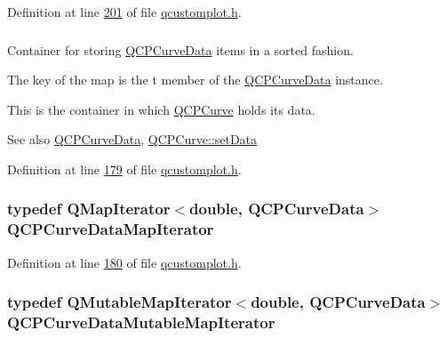 Definition at line \hyperlink{a00116_source_l00201}{201} of file \hyperlink{a00116_source}{qcustomplot.\+h}.

\hypertarget{a00116_a444d37ec9cb2951b3a7fe443c34d1658}{
\subsubsection[{Q\+C\+P\+Curve\+Data\+Map}]{}}\label{a00116_a444d37ec9cb2951b3a7fe443c34d1658}


Container for storing \hyperlink{a00029}{Q\+C\+P\+Curve\+Data} items in a sorted fashion. 

The key of the map is the t member of the \hyperlink{a00029}{Q\+C\+P\+Curve\+Data} instance.

This is the container in which \hyperlink{a00028}{Q\+C\+P\+Curve} holds its data. \begin{DoxySeeAlso}{See also}
\hyperlink{a00029}{Q\+C\+P\+Curve\+Data}, \hyperlink{a00028_a631ac886708460013b30052f49cbc9da}{Q\+C\+P\+Curve\+::set\+Data} 
\end{DoxySeeAlso}


Definition at line \hyperlink{a00116_source_l00179}{179} of file \hyperlink{a00116_source}{qcustomplot.\+h}.

\hypertarget{a00116_aeb3dbc9f09e8ce9957be86dd6e8c803d}{
\subsubsection[{Q\+C\+P\+Curve\+Data\+Map\+Iterator}]{\setlength{\rightskip}{0pt plus 5cm}typedef Q\+Map\+Iterator$<$double, {\bf Q\+C\+P\+Curve\+Data}$>$ {\bf Q\+C\+P\+Curve\+Data\+Map\+Iterator}}}\label{a00116_aeb3dbc9f09e8ce9957be86dd6e8c803d}


Definition at line \hyperlink{a00116_source_l00180}{180} of file \hyperlink{a00116_source}{qcustomplot.\+h}.

\hypertarget{a00116_ad85cf567575500cc8877fd65f4c5b9fb}{
\subsubsection[{Q\+C\+P\+Curve\+Data\+Mutable\+Map\+Iterator}]{\setlength{\rightskip}{0pt plus 5cm}typedef Q\+Mutable\+Map\+Iterator$<$double, {\bf Q\+C\+P\+Curve\+Data}$>$ {\bf Q\+C\+P\+Curve\+Data\+Mutable\+Map\+Iterator}}}\label{a00116_ad85cf567575500cc8877fd65f4c5b9fb}


